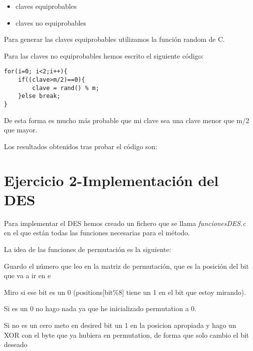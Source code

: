 \documentclass{apuntes}
\begin{document}
\begin{itemize}
	\item claves equiprobables
	\item claves no equiprobables
\end{itemize}

Para generar las claves equiprobables utilizamos la función random de C.

Para las claves no equiprobables hemos escrito el siguiente código:


\begin{lstlisting}
for(i=0; i<2;i++){
	if((clave>m/2)==0){
		clave = rand() % m;
	}else break;
}
\end{lstlisting}



De esta forma es mucho más probable que mi clave sea una clave menor que m/2 que mayor. 


Los resultados obtenidos tras probar el código son:



\section{Ejercicio 2-Implementación del DES}

Para implementar el DES hemos creado un fichero que se llama \textit{funcionesDES.c} en el que están todas las funciones necesarias para el método.

La idea de las funciones de permutación es la siguiente:

 Guardo el número que leo en la matriz de permutación, que es la posición del bit que va a ir en e 
 
 Miro si ese bit es un 0 (positions[bit\%8] tiene un 1 en el bit que estoy mirando).
 
 Si es un 0 no hago nada ya que he inicializado permutation a 0.
 
 Si no es un cero meto en desired bit un 1 en la posicion apropiada y hago un 
 XOR con el byte que ya hubiera en permutation, de forma que solo cambio el bit deseado




\printindex
\end{document}

